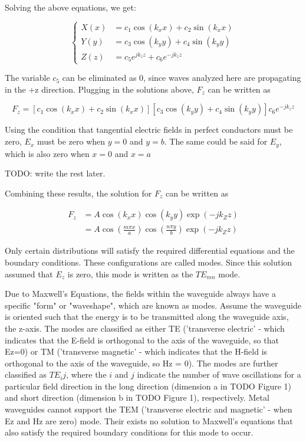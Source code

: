 \documentclass[a4paper,11pt]{jsarticle}
\begin{document}
Solving the above equations, we get:

\begin{equation} \label{eq:three_solved_ordinary}
  \left\{
  \begin{alignedat}{3}
    X(x) &= c_1 \cos (k_x x) + c_2 \sin (k_x x) \\
    Y(y) &= c_3 \cos (k_y y) + c_4 \sin (k_y y) \\
    Z(z) &= c_5 e^{j k_z z} + c_6 e^{-j k_z z}
  \end{alignedat}
  \right.
\end{equation}

The variable $c_5$ can be eliminated as $0$,
since waves analyzed here are propagating in the +z direction.
Plugging in the solutions above, $F_z$ can be written as

\begin{equation}
  F_z = [c_1 \cos (k_x x) + c_2 \sin (k_x x)][c_3 \cos (k_y y) + c_4 \sin (k_y y)]c_6 e^{-j k_z z}
\end{equation}

Using the condition that tangential electric fields in perfect conductors must be zero,
$E_x$ must be zero when $y=0$ and $y=b$.
The same could be said for $E_y$,
which is also zero when $x=0$ and $x=a$

TODO: write the rest later.

Combining these results, the solution for $F_z$ can be written as

\begin{equation}
  \begin{split}
    F_z &= A \cos(k_x x)\cos(k_y y)\exp(-j k_Z z) \\
        & = A \cos(\frac{m\pi x}{a}) \cos(\frac{n \pi y}{b})\exp(-j k_Z z)
  \end{split}
\end{equation}

Only certain distributions will satisfy the required differential equations
and the boundary conditions. These configurations are called modes.
Since this solution assumed that $E_z$ is zero, this mode is written as the $TE_{mn}$ mode.

Due to Maxwell's Equations,
the fields within the waveguide always have a specific "form" or "waveshape",
which are known as modes.
Assume the waveguide is oriented such that the energy is to be transmitted along the waveguide axis, the z-axis.
The modes are classified as either TE
('transverse electric' - which indicates that the E-field is orthogonal to the axis of the waveguide, so that Ez=0)
or TM ('transverse magnetic' - which indicates that the H-field is orthogonal to the axis of the waveguide, so Hz = 0).
The modes are further classified as $TE_ij$,
where the $i$ and $j$ indicate the number of wave oscillations for a particular
field direction in the long direction (dimension a in TODO Figure 1)
and short direction (dimension b in TODO Figure 1), respectively.
Metal waveguides cannot support the TEM
('transverse electric and magnetic' - when Ez and Hz are zero) mode.
Their exists no solution to Maxwell's equations
that also satisfy the required boundary conditions for this mode to occur.
\end{document}
